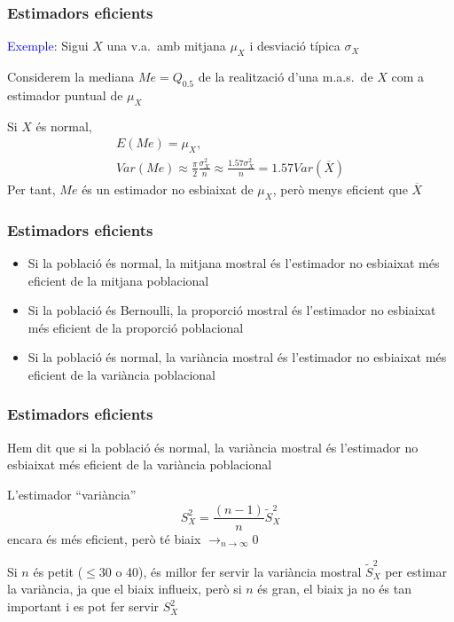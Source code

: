\documentclass[12pt,t]{beamer}
\newcommand{\blue}[1]{\textcolor{blue}{#1}}
\renewcommand{\leq}{\leqslant}
\def\tendeix{{\displaystyle\mathop{\longrightarrow}_{\scriptscriptstyle
n\to\infty}}}
\theoremstyle{plain}
\theoremstyle{definition}
\begin{document}
\begin{frame}
\frametitle{Estimadors eficients}

\blue{Exemple}: Sigui $X$ una v.a.\ amb mitjana $\mu_X$ i desviació típica $\sigma_X$
\medskip

Considerem la mediana $Me=Q_{0.5}$ de la realització d'una m.a.s.\ de $X$ com a estimador puntual de $\mu_X$
\medskip

Si $X$ és normal, 
$$
\begin{array}{l}
E(Me)=\mu_X,\\
\displaystyle  Var(Me)\approx \frac{\pi}{2}
     \frac{\sigma_{X}^2}{n}\approx \frac{1.57 \sigma_{X}^2}{n}=1.57Var(\overline{X})
\end{array}
$$
Per tant, $Me$ és un estimador no esbiaixat de   $\mu_X$, però menys eficient que $\overline{X}$



\end{frame}


\begin{frame}
\frametitle{Estimadors  eficients}

\begin{itemize}
\item Si la població és normal, la mitjana mostral és l'estimador
no esbiaixat més eficient de la mitjana poblacional
\medskip

\item Si la població és Bernoulli, la proporció mostral és l'estimador
no esbiaixat més eficient de la proporció poblacional
\medskip

\item Si la població és normal, la variància mostral és l'estimador
no esbiaixat  més eficient de la variància poblacional
 \end{itemize}




\end{frame}


\begin{frame}
\frametitle{Estimadors  eficients}

Hem dit que si la població és normal, la variància mostral és l'estimador
no esbiaixat  més eficient de la variància poblacional
\medskip

L'estimador ``variància''
$$
S_X^2=\frac{(n-1)}{n} \widetilde{S}_X^2
$$   
encara és més eficient, però  té biaix $\tendeix 0$
\medskip

Si $n$ és petit ($\leq 30$ o 40), és millor fer servir la variància mostral $\widetilde{S}_X^2$ per estimar la variància, ja que el biaix influeix, però si $n$ és gran, el biaix ja no és tan important i es pot fer servir $S_X^2$


\end{frame}
\end{document}
